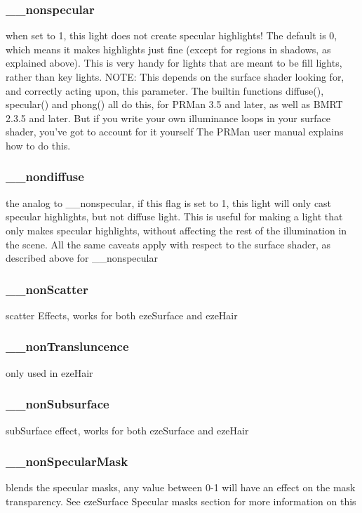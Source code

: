 \documentclass[final,letterpaper,twoside,12pt]{report}
\begin{document}
\subsubsection {\_\_nonspecular }
when set to 1, this light does not create  specular highlights!  The default is 0, which means it makes highlights just fine (except for regions in shadows, as  explained above).  This is very handy for lights that are meant to be fill lights, rather than key lights.  NOTE: This depends on the surface shader looking for, and correctly acting upon, this parameter.  The builtin functions  diffuse(), specular() and phong() all do this, for PRMan 3.5  and later, as well as BMRT 2.3.5 and later.  But if you write  your own illuminance loops in your surface shader, you've got  to account for it yourself The PRMan user manual explains how  to do this.
\smallskip
\subsubsection {\_\_nondiffuse }
the analog to \_\_nonspecular, if this flag is set to  1, this light will only cast specular highlights, but not  diffuse light.  This is useful for making a light that only  makes specular highlights, without affecting the rest of the  illumination in the scene.  All the same caveats apply with  respect to the surface shader, as described above for \_\_nonspecular
\smallskip

\subsubsection {\_\_nonScatter}
scatter Effects, works for both ezeSurface and ezeHair
\smallskip

\subsubsection {\_\_nonTransluncence}
only used in ezeHair
\smallskip

\subsubsection {\_\_nonSubsurface}
subSurface effect, works for both ezeSurface and ezeHair
\smallskip

\subsubsection {\_\_nonSpecularMask}
blends the specular masks, any value between 0-1 will have an effect on the mask transparency.
See ezeSurface Specular masks section for more information on this
\smallskip
\end{document}

